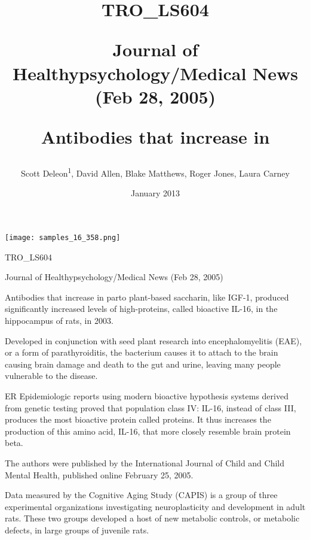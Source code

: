 \documentclass{article}
\title{TRO_LS604

Journal of Healthypsychology/Medical News (Feb 28, 2005)

Antibodies that increase in}
\author{Scott Deleon\textsuperscript{1},  David Allen,  Blake Matthews,  Roger Jones,  Laura Carney}
\affil{\textsuperscript{1}Tehran University of Medical Sciences}
\date{January 2013}
\begin{document}
\maketitle

\begin{center}
\begin{minipage}{0.75\linewidth}
\texttt{[image: samples\_16\_358.png]}
\end{minipage}
\end{center}

TRO\_LS604

Journal of Healthypsychology/Medical News (Feb 28, 2005)

Antibodies that increase in parto plant-based saccharin, like IGF-1, produced significantly increased levels of high-proteins, called bioactive IL-16, in the hippocampus of rats, in 2003.

Developed in conjunction with seed plant research into encephalomyelitis (EAE), or a form of parathyroiditis, the bacterium causes it to attach to the brain causing brain damage and death to the gut and urine, leaving many people vulnerable to the disease.

ER Epidemiologic reports using modern bioactive hypothesis systems derived from genetic testing proved that population class IV: IL-16, instead of class III, produces the most bioactive protein called proteins. It thus increases the production of this amino acid, IL-16, that more closely resemble brain protein beta.

The authors were published by the International Journal of Child and Child Mental Health, published online February 25, 2005.

Data measured by the Cognitive Aging Study (CAPIS) is a group of three experimental organizations investigating neuroplasticity and development in adult rats. These two groups developed a host of new metabolic controls, or metabolic defects, in large groups of juvenile rats.
\end{document}
